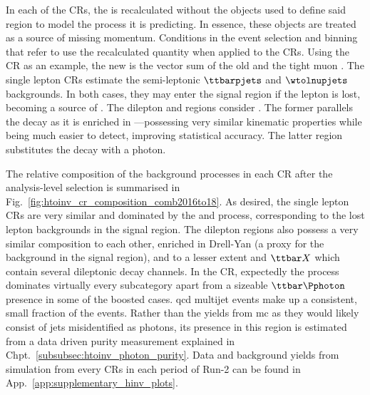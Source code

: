 In each of the \glspl{CR}, the \ptvecmiss is recalculated without the objects used to define said region to model the process it is predicting. In essence, these objects are treated as a source of missing momentum. Conditions in the event selection and binning that refer to \ptmiss use the recalculated quantity when applied to the \glspl{CR}. Using the \singleMuCr \gls{CR} as an example, the new \ptvecmiss is the vector sum of the old \ptvecmiss and the tight muon \ptvec. The single lepton \glspl{CR} estimate the semi-leptonic $\ttbarpjets$ and $\wtolnupjets$ backgrounds. In both cases, they may enter the signal region if the lepton is lost, becoming a source of \ptmiss. The dilepton and \singlePhotonCr regions consider \ztonunupjets. The former parallels the decay as it is enriched in \ztolplmpjets---possessing very similar kinematic properties while being much easier to detect, improving statistical accuracy. The latter region substitutes the \ztonunu decay with a photon.

The relative composition of the background processes in each \gls{CR} after the analysis-level selection is summarised in Fig.~\ref{fig:htoinv_cr_composition_comb2016to18}. As desired, the single lepton \glspl{CR} are very similar and dominated by the \ttbar and \wtolnu process, corresponding to the lost lepton backgrounds in the signal region. The dilepton regions also possess a very similar composition to each other, enriched in Drell-Yan \ztoll (a proxy for the \ztonunu background in the signal region), and to a lesser extent \ttbar and $\ttbar X$ which contain several dileptonic decay channels. In the \singlePhotonCr \gls{CR}, expectedly the \gammapjets process dominates virtually every subcategory apart from a sizeable $\ttbar \Pphoton$ presence in some of the boosted \ttH cases. \acrshort{qcd} multijet events make up a consistent, small fraction of the events. Rather than the yields from \acrshort{mc} as they would likely consist of \glspl{jet} misidentified as photons, its presence in this region is estimated from a data driven purity measurement explained in Chpt.~\ref{subsubsec:htoinv_photon_purity}. Data and background yields from simulation from every \glspl{CR} in each period of Run-2 can be found in App.~\ref{app:supplementary_hinv_plots}.

